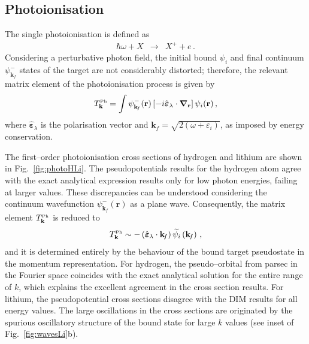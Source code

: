 \documentclass[10pt]{article}
\begin{document}
\subsection{Photoionisation}
\label{sec:photoatom}

The single photoionisation is defined as
\begin{eqnarray}
 \hbar\omega + X &\rightarrow& X^+ + e\,.
\end{eqnarray}
Considering a perturbative photon field, the initial bound $\psi_{i}$ 
and final continuum $\psi_{\mathbf{k}_{\!f}}^-$ states of the target 
are not considerably distorted; therefore, the relevant matrix 
element of the photoionisation process is given by
\begin{equation}
 T_{\mathbf{k}}^{\mbox{\tiny Ph}} = \int{
 \psi_{\mathbf{k}_{\!f}}^-(\mathbf{r}) 
 \left[-i \hat{\boldsymbol{\varepsilon}}_\lambda \cdot 
 \boldsymbol{\nabla}_\mathbf{r}\right] 
 \psi_{i}(\mathbf{r})}\,,
\end{equation}
where $\hat{\boldsymbol{\varepsilon}}_\lambda$ is the polarisation 
vector and $\mathbf{k}_{\!f}=\sqrt{2(\omega+\varepsilon_i)}$, as 
imposed by energy conservation.

The first--order photoionisation cross sections of hydrogen and 
lithium are shown in Fig.~\ref{fig:photoHLi}. The pseudopotentials 
results for the hydrogen atom agree with the exact analytical 
expression results only for low photon energies, failing at larger 
values. These discrepancies can be understood considering the 
continuum wavefunction $\psi_{\mathbf{k}_{\!f}}^-(\mathbf{r})$ as a 
plane wave. Consequently, the matrix element 
$T_{\mathbf{k}}^{\mbox{\tiny Ph}}$ is reduced to
\begin{equation}
 T_{\mathbf{k}}^{\mbox{\tiny Ph}} \sim 
 -\left(\hat{\boldsymbol{\varepsilon}}_\lambda \cdot \mathbf{k}_{\!f} \right)
 \widetilde{\psi_i} \left(\mathbf{k}_{\!f}\right)\,,
\end{equation}
and it is determined entirely by the behaviour of the bound target 
pseudostate in the momentum representation. For hydrogen, the 
pseudo--orbital from {\sc parsec} in the Fourier space coincides with 
the exact analytical solution for the entire range of $k$, which 
explains the excellent agreement in the cross section results. For 
lithium, the pseudopotential cross sections disagree with the DIM 
results for all energy values. The large oscillations in the cross 
sections are originated by the spurious oscillatory structure of the 
bound state for large $k$ values (see inset of 
Fig.~\ref{fig:wavesLi}b).
\end{document}
